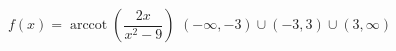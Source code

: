  {$f(x) = \operatorname{arccot}\left(\dfrac{2x}{x^2-9}\right)$}
{ $(-\infty, -3) \cup (-3,3) \cup (3, \infty)$}

